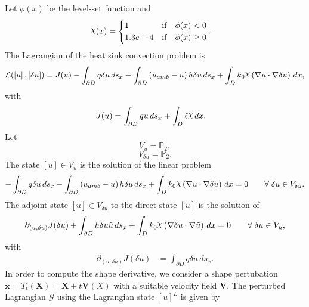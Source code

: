 \documentclass[preview]{standalone}
\let\oldcdot\cdot
\let\cdot\oldcdot
\begin{document}
Let $\phi(x)$ be the level-set function and
 \begin{align*}\raisebox{\depth}{$\chi$}(x) &= \begin{cases} 1 & \mbox{if}\quad \phi(x) < 0 \\ 1.3e-4 & \mbox{if}\quad \phi(x)  \ge 0 \end{cases}.\end{align*}
The Lagrangian of the heat sink convection problem is
\begin{dmath*}
\mathcal L(\left[ u\right],\left[ \delta u\right]) = J(u) -  \int_{\partial D} q \delta u \,ds_x -  \int_{\partial D} \left(u_{amb} - u\right) h \delta u \,ds_x +  \int_{D} k_{0} \raisebox{\depth}{$\chi$} \left(  \nabla u  \cdot  \nabla \delta u  \right) \,dx , 
\end{dmath*}
with 
\begin{align*}
J(u) &=  \int_{\partial D} q u \,ds_x +  \int_{D} \ell \raisebox{\depth}{$\chi$} \,dx.
 \end{align*}
Let
\begin{equation*}
V_{u} = \mathbb P_{2},\end{equation*}
\begin{equation*}
V_{\delta u} = \mathbb P_{2}.\end{equation*}
The state $\left[ u\right] \in  V_{u}$ is the solution of the linear problem
\begin{dmath*}
-  \int_{\partial D} q \delta u \,ds_x -  \int_{\partial D} \left(u_{amb} - u\right) h \delta u \,ds_x +  \int_{D} k_{0} \raisebox{\depth}{$\chi$} \left(  \nabla u  \cdot  \nabla \delta u  \right) \,dx = 0\qquad \forall\; {\delta u\in V_{\delta u}} . 
\end{dmath*}
The adjoint state $\left[ \tilde u\right] \in  V_{\delta u}$ to the direct state $\left[ u\right]$ is the solution of
\begin{dmath*}
\partial_{(u,\delta u)} J(\delta u) +  \int_{\partial D} h \delta u \tilde u \,ds_x +  \int_{D} k_{0} \raisebox{\depth}{$\chi$} \left(  \nabla \delta u  \cdot  \nabla \tilde u  \right) \,dx = 0\qquad \forall\; {\delta u\in V_{u}} , 
\end{dmath*}
with 
\begin{align*}
\partial_{(u,\delta u)} J(\delta u) &=  \int_{\partial D} q \delta u \,ds_x.
 \end{align*}
In order to compute the shape derivative, we consider a shape pertubation $\mathbf x = T_t(\mathbf X) = \mathbf X + t \mathbf  V(X)$ with a suitable velocity field $\mathbf V$. The perturbed Lagrangian $\mathcal G$ using the Lagrangian state $\left[ u\right]^{L}$ is given by
\end{document}
